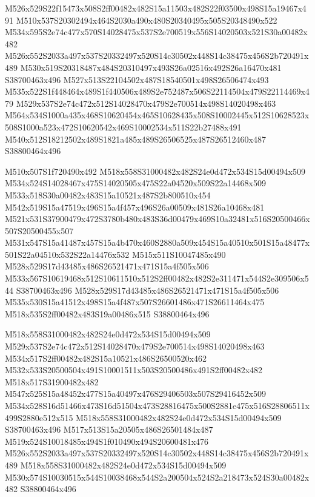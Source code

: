 \documentclass{article}
\begin{document}
\begin{multicols}{2}
M526x529S22f15473x508S2ff00482x482S15a11503x482S22f03500x498S15a19467x491 M510x537S20302494x464S2030a490x480S20340495x505S20348490x522 M534x595S2e74c477x570S14028475x537S2e700519x556S14020503x521S30a00482x482 M526x552S2033a497x537S20332497x520S14c30502x448S14c38475x456S2b720491x489 M530x519S20318487x484S20310497x493S26a02516x492S26a16470x481 S38700463x496 M527x513S22104502x487S18540501x498S26506474x493 M535x522S1f448464x489S1f440506x489S2e752487x506S22114504x479S22114469x479 M529x537S2e74c472x512S14028470x479S2e700514x498S14020498x463 M564x534S1000a435x468S10620454x465S10628435x508S10002445x512S10628523x508S1000a523x472S10620542x469S10002534x511S22b27488x491 M540x512S18212502x489S1821a485x489S26506525x487S26512460x487 S38800464x496

M510x507S1f720490x492 M518x558S31000482x482S24e0d472x534S15d00494x509 M534x524S14028467x475S14020505x475S22a04520x509S22a14468x509 M533x518S30a00482x483S15a10521x487S2b800510x454 M542x519S15a47519x496S15a4f457x496S26a00509x481S26a10468x481 M521x531S37900479x472S3780b480x483S36d00479x469S10a32481x516S20500466x507S20500455x507 M531x547S15a41487x457S15a4b470x460S2880a509x454S15a40510x501S15a48477x501S22a04510x532S22a14476x532 M515x511S10047485x490 M528x529S17d43485x486S26521471x471S15a4f505x506 M533x567S10619468x512S10611510x512S2ff00482x482S2e311471x544S2e309506x544 S38700463x496 M528x529S17d43485x486S26521471x471S15a4f505x506 M535x530S15a41512x498S15a4f487x507S26601486x471S26611464x475 M518x535S2ff00482x483S19a00486x515 S38800464x496

M518x558S31000482x482S24e0d472x534S15d00494x509 M529x537S2e74c472x512S14028470x479S2e700514x498S14020498x463 M534x517S2ff00482x482S15a10521x486S26500520x462 M532x533S20500504x491S10001511x503S20500486x491S2ff00482x482 M518x517S31900482x482 M547x525S15a48452x477S15a40497x476S29406503x507S29416452x509 M534x528S16d51466x473S16d51504x473S28816475x500S2881e475x516S28806511x499S2880e512x515 M518x558S31000482x482S24e0d472x534S15d00494x509 S38700463x496 M517x513S15a20505x486S26501484x487 M519x524S10018485x494S1f010490x494S20600481x476 M526x552S2033a497x537S20332497x520S14c30502x448S14c38475x456S2b720491x489 M518x558S31000482x482S24e0d472x534S15d00494x509 M530x574S10030515x544S10038468x544S2a200504x524S2a218473x524S30a00482x482 S38800464x496


\end{multicols}
\end{document}
